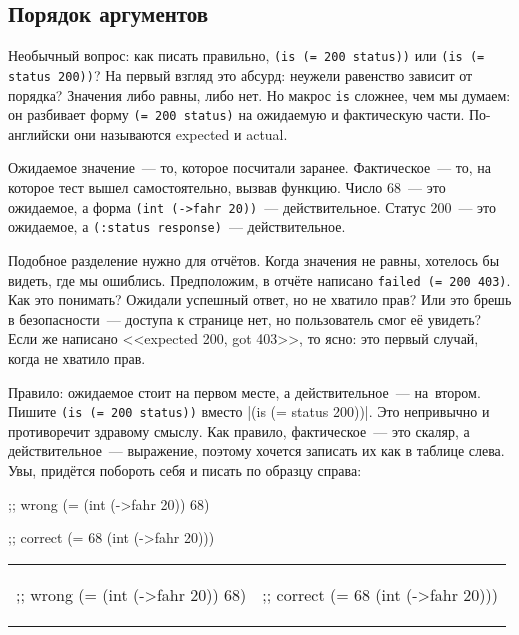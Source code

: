 \subsection{Порядок аргументов}


Необычный вопрос: как писать правильно, \verb|(is (= 200 status))| или
\verb|(is (= status 200))|? На первый взгляд это абсурд: неужели равенство
зависит от порядка? Значения либо равны, либо нет. Но макрос \verb|is|
сложнее, чем мы думаем: он разбивает форму \verb|(= 200 status)| на ожидаемую
и фактическую части. По-английски они называются expected и actual.

\mnoindent
Ожидаемое значение~--- то, которое посчитали заранее. Фактическое~--- то, на
которое тест вышел самостоятельно, вызвав функцию. Число 68~--- это ожидаемое, а
форма \verb|(int (->fahr 20))|~--- действительное. Статус 200~--- это ожидаемое,
а \verb|(:status response)|~--- действительное.

Подобное разделение нужно для отчётов. Когда значения не равны, хотелось бы
видеть, где мы ошиблись. Предположим, в отчёте написано
\verb|failed (= 200 403)|. Как это понимать? Ожидали успешный ответ, но не
хватило прав? Или это брешь в безопасности~--- доступа к странице нет, но
пользователь смог её увидеть? Если же написано <<expected 200, got 403>>, то
ясно: это первый случай, когда не хватило прав.

Правило: ожидаемое стоит на первом месте, а действительное~--- на~втором. Пишите
\verb|(is (= 200 status))| вместо \spverb|(is (= status 200))|.  Это непривычно
и противоречит здравому смыслу. Как правило, фактическое~--- это скаляр, а
действительное~--- выражение, поэтому хочется записать их как в таблице слева.
Увы, придётся побороть себя и писать по образцу справа:

\ifx\DEVICETYPE\MOBILE

\begin{english}
  \begin{clojure}
;; wrong
(= (int (->fahr 20)) 68)
  \end{clojure}

\splitter

  \begin{clojure}
;; correct
(= 68 (int (->fahr 20)))
  \end{clojure}
\end{english}

\else

\begin{english}

\noindent
\begin{tabular}{ @{}p{5cm} @{}p{5cm} }

  \begin{clojure}
;; wrong
(= (int (->fahr 20)) 68)
  \end{clojure}

&

  \begin{clojure}
;; correct
(= 68 (int (->fahr 20)))
  \end{clojure}

\end{tabular}

\end{english}

